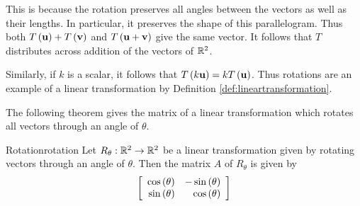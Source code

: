 This is because the rotation preserves all angles between the vectors
as well as their lengths. In particular, it preserves the shape of
this parallelogram. Thus both
$T\left({\bf u}\right)+T\left({\bf v}\right)$ and
$T\left({\bf u}+{\bf v}\right)$ give the same vector. It follows
that $T$ distributes across addition of the vectors of
$\mathbb{R}^{2}$.

Similarly, if $k$ is a scalar, it follows that $T\left(k{\bf u}\right)=kT\left({\bf u}\right)$.
Thus rotations are an example of a
linear transformation by Definition \ref{def:lineartransformation}.

The following theorem gives the matrix of a linear transformation which rotates all vectors through an angle of $\theta$. 

\begin{theorem}{Rotation}{rotation}
Let $R_{\theta}: \mathbb{R}^2 \to \mathbb{R}^2$ be a linear transformation given by rotating vectors through an angle of $\theta$. Then the matrix $A$ of $R_{\theta}$ is given by 
\[
\left[
\begin{array}{rr}
\cos \left( \theta \right) & -\sin \left( \theta \right) \\
\sin \left( \theta \right) & \cos \left( \theta \right)
\end{array}
\right]
\]
\end{theorem}


